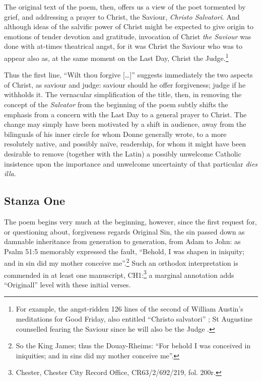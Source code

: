 \begin{paper}
The original text of the poem, then, offers us a view of the poet
tormented by grief, and addressing a prayer to Christ, the Saviour,
\emph{Christo Salvatori}. And although ideas of the salvific power of
Christ might be expected to give origin to emotions of tender devotion
and gratitude, invocation of Christ \emph{the Saviour} was done with
at-times theatrical angst, for it was Christ the Saviour who was to
appear also as, at the same moment on the Last Day, Christ the
Judge.\footnote{For example, the angst-ridden 126 lines of the second of
  William Austin's meditations for Good Friday, also entitled ``Christo
  salvatori'' \citep[117--22]{austin_devotionis_1635}; St Augustine counselled fearing
  the Saviour since he will also be the Judge \citep[CCXIII.6]{augustinus_sermones_nodate}.}

Thus the first line, ``Wilt thou forgive {[}\ldots{}{]}'' suggests
immediately the two aspects of Christ, as saviour and judge: saviour
should he offer forgiveness; judge if he withholds it. The vernacular
simplification of the title, then, in removing the concept of the
\emph{Salvator} from the beginning of the poem subtly shifts the
emphasis from a concern with the Last Day to a general prayer to Christ.
The change may simply have been motivated by a shift in audience, away
from the bilinguals of his inner circle for whom Donne generally wrote,
to a more resolutely native, and possibly naïve, readership, for whom it
might have been desirable to remove (together with the Latin) a possibly
unwelcome Catholic insistence upon the importance and unwelcome
uncertainty of that particular \emph{dies illa}.

\subsection{Stanza One}

The poem begins very much at the beginning, however, since the first
request for, or questioning about, forgiveness regards Original Sin, the
sin passed down as damnable inheritance from generation to generation,
from Adam to John: as Psalm 51:5 memorably expressed the fault,
``Behold, I was shapen in iniquity; and in sin did my mother conceive
me''.\footnote{So the King James; thus the Douay-Rheims: ``For behold I
  was conceived in iniquities; and in sins did my mother conceive me''.}
Such an orthodox interpretation is commended in at least one manuscript,
CH1:\footnote{Chester, Chester City Record Office, CR63/2/692/219, fol.
  200r.} a marginal annotation adds ``Originall'' level with these
initial verses.


\end{paper}
